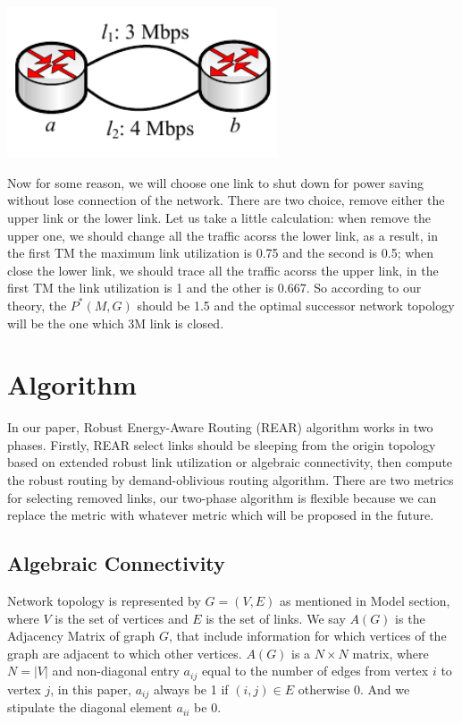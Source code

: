 \documentclass[conference]{IEEEtran}
\begin{document}
\vspace*{0.2in}
\includegraphics[width=8cm]{3-nodes-example}
\vspace*{0.2in}


Now for some reason, we will choose one link to shut down for power saving without lose connection of the network. 
There are two choice, remove either the upper link or the lower link. Let us take a little calculation: when 
remove the upper one, we should change all the traffic acorss the lower link, as a result, in the first  
TM the maximum link utilization is 0.75 and the second is 0.5; when close the lower link, we should trace all the 
traffic acorss the upper link, in the first TM the link utilization is 1 and the other is 0.667. 
So according to our theory, the $P^{*}(M, G)$ should be 1.5 and the optimal successor network topology will be
the one which 3M link is closed.

\section{Algorithm}
In our paper, Robust Energy-Aware Routing (REAR) algorithm works in two phases. Firstly, REAR select links 
should be sleeping from the origin topology based on extended robust link utilization or algebraic connectivity, 
then compute the robust routing by demand-oblivious routing algorithm. There are two metrics
for selecting removed links, our two-phase algorithm is flexible because we can replace the metric with whatever
metric which will be proposed in the future.


\subsection{Algebraic Connectivity}
Network topology is represented by $G = (V, E)$ as mentioned in Model section, where $V$ is the set of vertices
and $E$ is the set of links. We say $A(G)$ is the Adjacency Matrix of graph $G$, that include information for which
vertices of the graph are adjacent to which other vertices. $A(G)$ is a $N \times N$ matrix, where
$N = |V|$ and non-diagonal entry $a_{ij}$ equal to the number of edges from vertex $i$ to vertex $j$, in this paper,
$a_{ij}$ always be 1 if $(i,j) \in E$ otherwise 0. And we stipulate the diagonal element $a_{ii}$ be 0.
\end{document}
